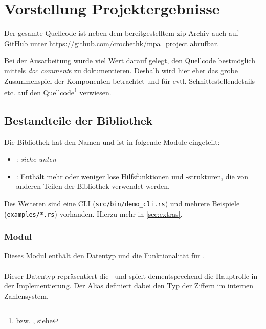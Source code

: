 \section{Vorstellung Projektergebnisse}\label{sec:projektergebnisse}
    Der gesamte Quellcode ist neben dem bereitgestelltem zip-Archiv auch auf GitHub unter \url{https://github.com/crochethk/mpa_project} abrufbar.

    Bei der Ausarbeitung wurde viel Wert darauf gelegt, den Quellcode bestmöglich mittels \emph{doc comment}s zu dokumentieren. Deshalb wird hier eher das grobe Zusammenspiel der Komponenten betrachtet und für evtl. Schnittestellendetails etc. auf den Quellcode\footnote{bzw. , siehe } verwiesen.

    \subsection{Bestandteile der Bibliothek}
        Die Bibliothek hat den Namen  und ist in folgende Module eingeteilt:

        \begin{itemize}
            \tightlist
            \item
            : \textit{siehe unten}
            \item
            : Enthält mehr oder weniger lose Hilfsfunktionen und -strukturen, die von anderen Teilen der Bibliothek verwendet werden.
        \end{itemize}

        Des Weiteren sind eine CLI (\texttt{src/bin/demo\_cli.rs}) und mehrere Beispiele (\texttt{examples/*.rs}) vorhanden. Hierzu mehr in \autoref{sec:extras}.

    \subsubsection*{Modul }
        Dieses Modul enthält den Datentyp und die Funktionalität für \mpi.

        \paragraph{}
            Dieser Datentyp repräsentiert die \mpi\ und spielt dementsprechend die Hauptrolle in der Implementierung. Der Alias  definiert dabei den Typ der Ziffern im internen Zahlensystem.

